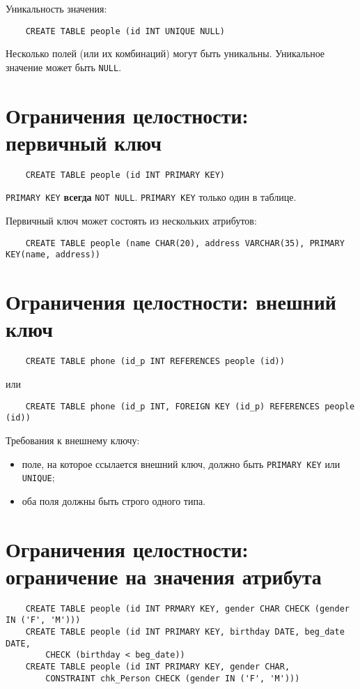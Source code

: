 Уникальность значения:
\begin{verbatim}
	CREATE TABLE people (id INT UNIQUE NULL)
\end{verbatim}
Несколько полей (или их комбинаций) могут быть уникальны.
Уникальное значение может быть \texttt{NULL}.

\section{Ограничения целостности: первичный ключ}

\begin{verbatim}
	CREATE TABLE people (id INT PRIMARY KEY)
\end{verbatim}
\texttt{PRIMARY KEY} \textbf{всегда} \texttt{NOT NULL}.
\texttt{PRIMARY KEY} только один в таблице.

Первичный ключ может состоять из нескольких атрибутов:
\begin{verbatim}
	CREATE TABLE people (name CHAR(20), address VARCHAR(35), PRIMARY KEY(name, address))
\end{verbatim}

\section{Ограничения целостности: внешний ключ}

\begin{verbatim}
	CREATE TABLE phone (id_p INT REFERENCES people (id))
\end{verbatim}
или
\begin{verbatim}
	CREATE TABLE phone (id_p INT, FOREIGN KEY (id_p) REFERENCES people (id))
\end{verbatim}

Требования к внешнему ключу:
\begin{itemize}
	\item поле, на которое ссылается внешний ключ, должно быть \texttt{PRIMARY KEY} или \texttt{UNIQUE};
	\item оба поля должны быть строго одного типа.
\end{itemize}

\section{Ограничения целостности: ограничение на значения атрибута}

\begin{verbatim}
	CREATE TABLE people (id INT PRMARY KEY, gender CHAR CHECK (gender IN ('F', 'M')))
	CREATE TABLE people (id INT PRIMARY KEY, birthday DATE, beg_date DATE,
		CHECK (birthday < beg_date))
	CREATE TABLE people (id INT PRIMARY KEY, gender CHAR,
		CONSTRAINT chk_Person CHECK (gender IN ('F', 'M')))
\end{verbatim}

